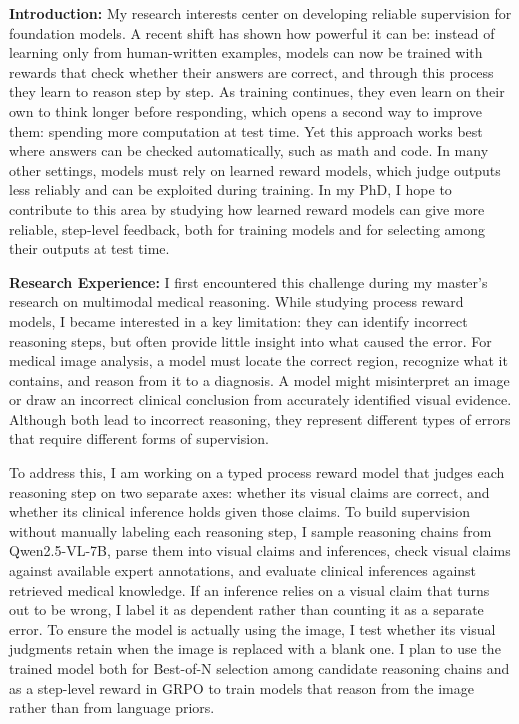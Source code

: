 \documentclass{article}
\begin{document}
\textbf{Introduction:} My research interests center on developing reliable supervision for foundation models. A recent shift has shown how powerful it can be: instead of learning only from human-written examples, models can now be trained with rewards that check whether their answers are correct, and through this process they learn to reason step by step. As training continues, they even learn on their own to think longer before responding, which opens a second way to improve them: spending more computation at test time. Yet this approach works best where answers can be checked automatically, such as math and code. In many other settings, models must rely on learned reward models, which judge outputs less reliably and can be exploited during training. In my PhD, I hope to contribute to this area by studying how learned reward models can give more reliable, step-level feedback, both for training models and for selecting among their outputs at test time.





\textbf{Research Experience:} I first encountered this challenge during my master’s research on multimodal medical reasoning. While studying process reward models, I became interested in a key limitation: they can identify incorrect reasoning steps, but often provide little insight into what caused the error. For medical image analysis, a model must locate the correct region, recognize what it contains, and reason from it to a diagnosis. A model might misinterpret an image or draw an incorrect clinical conclusion from accurately identified visual evidence. Although both lead to incorrect reasoning, they represent different types of errors that require different forms of supervision.

To address this, I am working on a typed process reward model that judges each reasoning step on two separate axes: whether its visual claims are correct, and whether its clinical inference holds given those claims. To build supervision without manually labeling each reasoning step, I sample reasoning chains from Qwen2.5-VL-7B, parse them into visual claims and inferences, check visual claims against available expert annotations, and evaluate clinical inferences against retrieved medical knowledge. If an inference relies on a visual claim that turns out to be wrong, I label it as dependent rather than counting it as a separate error. To ensure the model is actually using the image, I test whether its visual judgments retain when the image is replaced with a blank one. I plan to use the trained model both for Best-of-N selection among candidate reasoning chains and as a step-level reward in GRPO to train models that reason from the image rather than from language priors.
\end{document}
